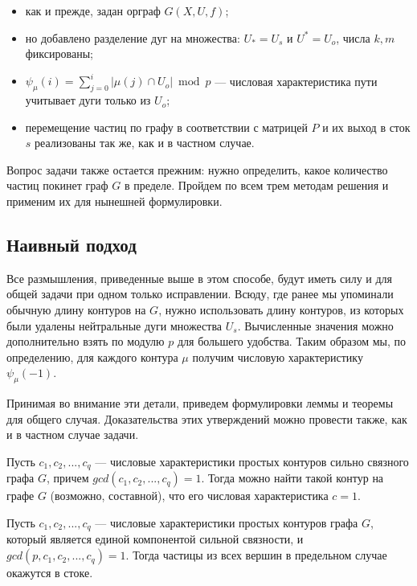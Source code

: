\begin{itemize}
	\item как и прежде, задан орграф $G(X,U,f)$;
	\item но добавлено разделение дуг на множества: $U_* = U_s$ и $U^* = U_o$, числа $k, m$ фиксированы;
	\item $\psi_\mu(i) = \sum_{j=0}^i | \mu(j) \cap U_o | \bmod p$ --- числовая характеристика пути учитывает дуги только из $U_o$; 
	\item перемещение частиц по графу в соответствии с матрицей $P$ и их выход в сток $s$ реализованы так же, как и в частном случае.
\end{itemize}

Вопрос задачи также остается прежним: нужно определить, какое количество частиц покинет граф $G$ в пределе. Пройдем по всем трем методам решения и применим их для нынешней формулировки. 

\subsection{Наивный подход}

Все размышления, приведенные выше в этом способе, будут иметь силу и для общей задачи при одном только исправлении. Всюду, где ранее мы упоминали обычную длину контуров на $G$, нужно использовать длину контуров, из которых были удалены нейтральные дуги множества $U_s$. Вычисленные значения можно дополнительно взять по модулю $p$ для большего удобства. Таким образом мы, по определению, для каждого контура $\mu$ получим числовую характеристику $\psi_\mu(-1)$. 

Принимая во внимание эти детали, приведем формулировки леммы и теоремы для общего случая. Доказательства этих утверждений можно провести также, как и в частном случае задачи. 

\begin{lemma}
	Пусть $c_1, c_2, ... , c_q$ --- числовые характеристики простых контуров сильно связного графа $G$, причем $gcd(c_1, c_2, ... , c_q) = 1$. Тогда можно найти такой контур на графе $G$ (возможно, составной), что его числовая характеристика $c = 1$.
\end{lemma}

\begin{theorem}
	Пусть $c_1, c_2, ... , c_q $ --- числовые характеристики простых контуров графа $G$, который является единой компонентой сильной связности, и $gcd(p, c_1, c_2, ... , c_q) = 1$. Тогда частицы из всех вершин в предельном случае окажутся в стоке.
\end{theorem}

